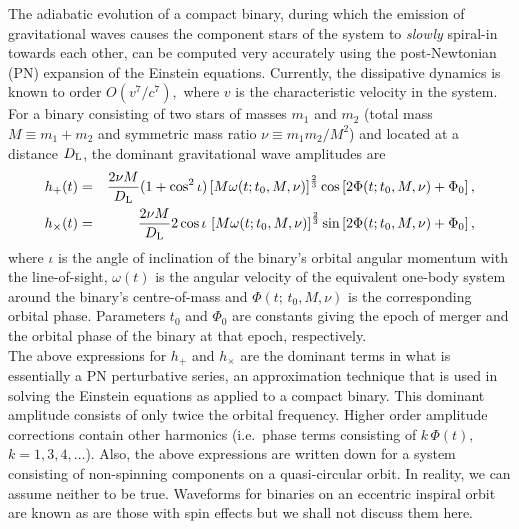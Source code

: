 {The adiabatic evolution of a compact binary, during which the 
emission of gravitational waves causes the component stars 
of the system to {\em slowly} spiral-in towards each other, 
can be computed very accurately using the post-Newtonian 
(PN) expansion of the Einstein equations. Currently, the 
dissipative dynamics is known \cite{BLANCHETREF} to order
$O(v^7/c^7),$ where $v$ is the characteristic velocity in 
the system.  
\\[10pt]\indent
{}
For a binary consisting of two stars of masses $m_1$ and 
$m_2$ (total mass $M\equiv m_1+m_2$ and symmetric mass ratio 
$\nu\equiv m_1m_2/M^2$) and located at a distance $D_{\rm L}$, 
the dominant gravitational wave amplitudes are 
\begin{eqnarray}
h_+(t) & = & \frac{2\nu M}{D_{\rm L}}(1 + \cos^2\iota)
\left [M\omega(t;t_0,M,\nu) \right ]^{\frac{2}{3}} \cos \left [2\Phi(t; t_0, M,\nu) + \Phi_0 \right ],\\
h_\times(t) & = & \frac{2\nu M}{D_{\rm L}}2\cos\iota\,
\left [M\omega(t;t_0,M,\nu) \right ]^{\frac{2}{3}} \sin \left [2\Phi(t;t_0, M,\nu) + \Phi_0 \right ],
\label{eq:amps}
\end{eqnarray}
where $\iota$ is the angle of inclination of the binary's orbital angular
momentum with the line-of-sight, $\omega(t)$ is the angular velocity 
of the equivalent one-body system around the binary's centre-of-mass and 
$\Phi(t;\, t_0,M,\nu)$ is the corresponding orbital phase. Parameters 
$t_0$ and $\Phi_0$ are constants giving the epoch of merger and the 
orbital phase of the binary at that epoch, respectively. 
\\[10pt]\indent
The above expressions for $h_+$ and $h_\times$ are the dominant 
terms in what is essentially a PN perturbative series, an 
approximation technique that is used in solving the Einstein 
equations as applied to a compact binary.  This dominant amplitude
consists of only twice the orbital frequency. Higher order amplitude 
corrections contain other harmonics (i.e.\ phase terms consisting of 
$k\,\Phi(t),$ $k=1,3,4,\ldots$).  Also, the above expressions are 
written down for a system consisting of non-spinning components on a 
quasi-circular orbit. In reality, we can assume neither to be 
true. Waveforms for binaries on an eccentric inspiral orbit are 
known as are those with spin effects but we shall not discuss them here.}


